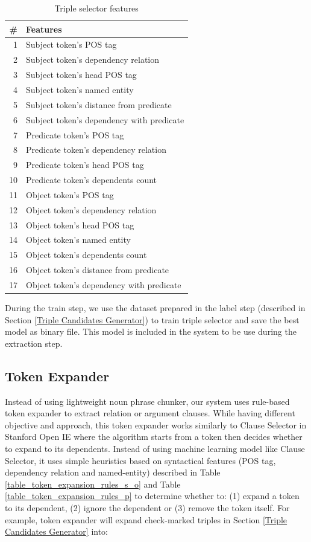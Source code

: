 \documentclass[conference,compsoc,12pt]{IEEEtran}
\begin{document}
\begin{table}[!t]
\renewcommand{\arraystretch}{1.5}
\caption{Triple selector features}
\label{table_models_features}
\centering
\begin{tabular}{r l}
\hline
\textbf{\#} & \textbf{Features} \\
\hline
1 & Subject token's POS tag \\
2 & Subject token's dependency relation \\
3 & Subject token's head POS tag \\
4 & Subject token's named entity \\
5 & Subject token's distance from predicate \\
6 & Subject token's dependency with predicate \\
7 & Predicate token's POS tag \\
8 & Predicate token's dependency relation \\
9 & Predicate token's head POS tag \\
10 & Predicate token's dependents count \\
11 & Object token's POS tag \\
12 & Object token's dependency relation \\
13 & Object token's head POS tag \\
14 & Object token's named entity \\
15 & Object token's dependents count \\
16 & Object token's distance from predicate \\
17 & Object token's dependency with predicate \\
\end{tabular}
\end{table}

During the train step, we use the dataset prepared in the label step (described in Section \ref{Triple Candidates Generator}) to train triple selector and save the best model as binary file. This model is included in the system to be use during the extraction step.

\subsection{Token Expander}

Instead of using lightweight noun phrase chunker\cite{banko2007open}, our system uses rule-based token expander to extract relation or argument clauses. While having different objective and approach, this token expander works similarly to Clause Selector in Stanford Open IE\cite{angeli2015leveraging} where the algorithm starts from a token then decides whether to expand to its dependents. Instead of using machine learning model like Clause Selector, it uses simple heuristics based on syntactical features (POS tag, dependency relation and named-entity) described in Table \ref{table_token_expansion_rules_s_o} and Table \ref{table_token_expansion_rules_p} to determine whether to: (1) expand a token to its dependent, (2) ignore the dependent or (3) remove the token itself. For example, token expander will expand check-marked triples in Section \ref{Triple Candidates Generator} into:
\end{document}
